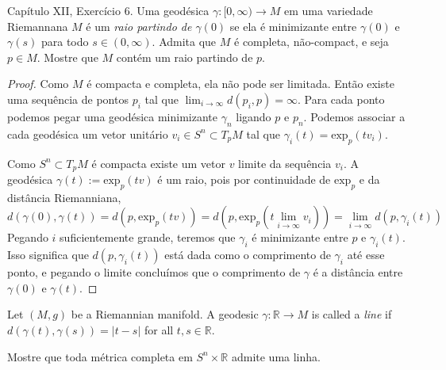 \begin{exercise}
\label{exercise-l5-5}
\cite{doc} Capítulo XII, Exercício 6. Uma geodésica $\gamma:[0,\infty)\to M$ em
uma variedade Riemannana $M$ é um {\it raio partindo de $\gamma(0)$} se ela é
minimizante entre $\gamma(0)$ e $\gamma(s)$ para todo  $s \in (0,\infty)$.
Admita que $M$ é completa, não-compact, e seja $p \in M$. Mostre que $M$ contém
um raio partindo de $p$.
\end{exercise}

\begin{proof}
Como $M$ é compacta e completa, ela não pode ser limitada. Então
existe uma sequência de pontos $p_i$  tal que $\lim_{i \to \infty}
d(p_i,p)=\infty$. Para cada ponto podemos pegar uma geodésica minimizante
$\gamma_n$ ligando $p$ e $p_n$. Podemos associar a cada geodésica um vetor
unitário $v_i \in S^n \subset T_pM$ tal que $\gamma_i(t)=\text{exp}_p(tv_i)$.

Como $S^n \subset T_pM$ é compacta existe um vetor $v$ limite da sequência
$v_i$. A geodésica $\gamma(t):=\text{exp}_p(tv)$ é um raio, pois por
continuidade de $\text{exp}_p$ e da distância Riemanniana,
$$
d(\gamma(0),\gamma(t))=d\left(p,\text{exp}_p(tv)\right)
=d\left(p,\text{exp}_p\left(t\lim_{i \to \infty} v_i\right)\right)
=\lim_{i \to \infty} d(p,\gamma_i (t))
$$
Pegando $i$ suficientemente grande, teremos que $\gamma_i$ é minimizante entre
$p$ e $\gamma_i(t)$. Isso significa que $d(p,\gamma_i(t))$ está dada como o
comprimento de $\gamma_i$ até esse ponto, e pegando o limite concluímos que o
comprimento de $\gamma$ é a distância entre $\gamma(0)$ e $\gamma(t)$.
\end{proof}

\begin{definition}
\label{definition-line-riemannian-manifold}
Let $(M,g)$ be a Riemannian manifold. A geodesic $\gamma:\mathbb{R} \to M$ is
called a {\it line} if $d(\gamma(t),\gamma(s))=|t-s|$ for all $t,s \in
\mathbb{R}$.
\end{definition}

\begin{exercise}
\label{exercise-l5-6}
Mostre que toda métrica completa em $S^n \times \mathbb{R}$ admite uma linha.
\end{exercise}

